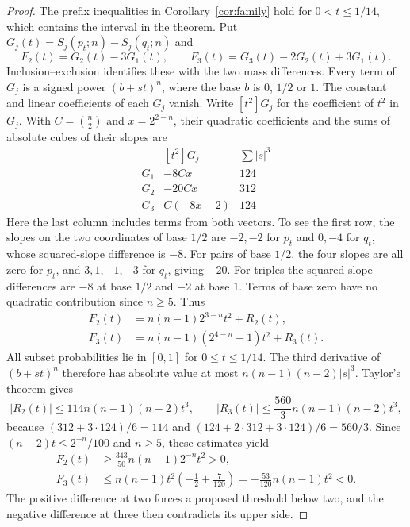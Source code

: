 \documentclass[11pt,a4paper]{article}
\begin{document}
\begin{proof}
The prefix inequalities in Corollary~\ref{cor:family} hold for
$0<t\leq1/14$, which contains the interval in the theorem.
Put $G_j(t)=S_j(p_t;n)-S_j(q_t;n)$ and
\[
 F_2(t)=G_2(t)-3G_1(t),\qquad
 F_3(t)=G_3(t)-2G_2(t)+3G_1(t).
\]
Inclusion--exclusion identifies these with the two mass differences.
Every term of $G_j$ is a signed power $(b+st)^n$, where the base $b$
is $0$, $1/2$ or $1$. The constant and linear coefficients of each
$G_j$ vanish. Write $[t^2]G_j$ for the coefficient of $t^2$ in $G_j$.
With $C=\binom n2$ and $x=2^{2-n}$, their quadratic
coefficients and the sums of absolute cubes of their slopes are
\[
\begin{array}{c|rr}
 & [t^2]G_j & \sum |s|^3\\\hline
G_1&-8Cx&124\\
G_2&-20Cx&312\\
G_3&C(-8x-2)&124
\end{array}
\]
Here the last column includes terms from both vectors. To see the first
row, the slopes on the two coordinates of base $1/2$ are $-2,-2$
for $p_t$ and $0,-4$ for $q_t$, whose squared-slope difference is $-8$.
For pairs of base $1/2$, the four slopes are all zero for $p_t$, and
$3,1,-1,-3$ for $q_t$, giving $-20$. For triples the squared-slope
differences are $-8$ at base $1/2$ and $-2$ at base $1$.
Terms of base zero have no quadratic contribution since $n\geq5$.
Thus
\begin{align}
 F_2(t)&=n(n-1)2^{3-n}t^2+R_2(t),\label{eq:alln2}\\
 F_3(t)&=n(n-1)(2^{4-n}-1)t^2+R_3(t).\label{eq:alln3}
\end{align}
All subset probabilities lie in $[0,1]$ for $0\leq t\leq1/14$.
The third derivative of $(b+st)^n$ therefore has absolute value at
most $n(n-1)(n-2)|s|^3$. Taylor's theorem gives
\[
 |R_2(t)|\leq114n(n-1)(n-2)t^3,\qquad
 |R_3(t)|\leq\frac{560}{3}n(n-1)(n-2)t^3,
\]
because $(312+3\cdot124)/6=114$ and
$(124+2\cdot312+3\cdot124)/6=560/3$.
Since $(n-2)t\leq 2^{-n}/100$ and $n\geq5$, these estimates yield
\begin{align*}
 F_2(t)&\geq \frac{343}{50}n(n-1)2^{-n}t^2>0,\\
 F_3(t)&\leq n(n-1)t^2\left(-\frac12+\frac7{120}\right)
          =-\frac{53}{120}n(n-1)t^2<0.
\end{align*}
The positive difference at two forces a proposed threshold below two,
and the negative difference at three then contradicts its upper side.
\end{proof}
\end{document}

